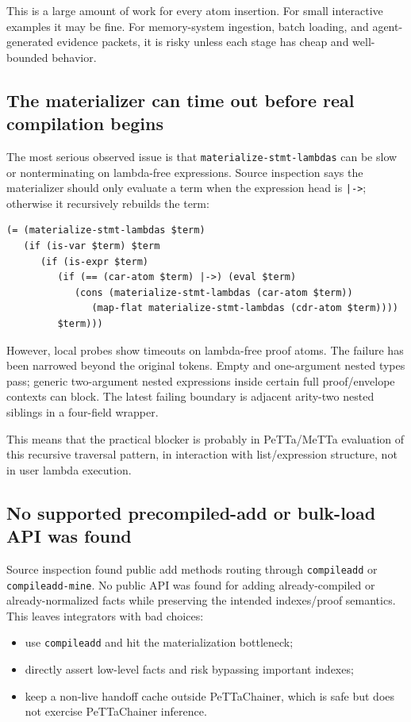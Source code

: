\documentclass[11pt]{article}
\newcommand{\code}[1]{\texttt{#1}}
\begin{document}
This is a large amount of work for every atom insertion.  For small interactive
examples it may be fine.  For memory-system ingestion, batch loading, and
agent-generated evidence packets, it is risky unless each stage has cheap and
well-bounded behavior.

\subsection{The materializer can time out before real compilation begins}

The most serious observed issue is that \code{materialize-stmt-lambdas} can be
slow or nonterminating on lambda-free expressions.  Source inspection says the
materializer should only evaluate a term when the expression head is \code{|->};
otherwise it recursively rebuilds the term:
\begin{verbatim}
(= (materialize-stmt-lambdas $term)
   (if (is-var $term) $term
      (if (is-expr $term)
         (if (== (car-atom $term) |->) (eval $term)
            (cons (materialize-stmt-lambdas (car-atom $term))
               (map-flat materialize-stmt-lambdas (cdr-atom $term))))
         $term)))
\end{verbatim}

However, local probes show timeouts on lambda-free proof atoms.  The failure has
been narrowed beyond the original tokens.  Empty and one-argument nested types
pass; generic two-argument nested expressions inside certain full proof/envelope
contexts can block.  The latest failing boundary is adjacent arity-two nested
siblings in a four-field wrapper.

This means that the practical blocker is probably in PeTTa/MeTTa evaluation of
this recursive traversal pattern, in interaction with list/expression structure,
not in user lambda execution.

\subsection{No supported precompiled-add or bulk-load API was found}

Source inspection found public add methods routing through \code{compileadd} or
\code{compileadd-mine}.  No public API was found for adding already-compiled or
already-normalized facts while preserving the intended indexes/proof semantics.
This leaves integrators with bad choices:
\begin{itemize}
  \item use \code{compileadd} and hit the materialization bottleneck;
  \item directly assert low-level facts and risk bypassing important indexes;
  \item keep a non-live handoff cache outside PeTTaChainer, which is safe but
  does not exercise PeTTaChainer inference.
\end{itemize}
\end{document}
